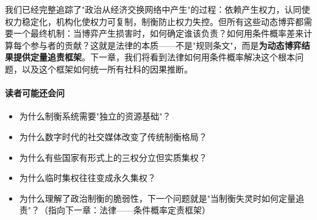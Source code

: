 \documentclass[../main.tex]{subfiles}
\begin{document}
	我们已经完整追踪了"政治从经济交换网络中产生"的过程：依赖产生权力，认同使权力稳定化，机构化使权力可复制，制衡防止权力失控。但所有这些动态博弈都需要一个最终机制：当博弈产生损害时，如何确定谁该负责？如何用条件概率差来计算每个参与者的贡献？这就是法律的本质——不是"规则条文"，而是\textbf{为动态博弈结果提供定量追责框架}。下一章，我们将看到法律如何用条件概率解决这个根本问题，以及这个框架如何统一所有社科的因果推断。
	
	\paragraph*{读者可能还会问}
	\begin{itemize}

	\item 为什么制衡系统需要"独立的资源基础"？

	\item 为什么数字时代的社交媒体改变了传统制衡格局？

	\item 为什么有些国家有形式上的三权分立但实质集权？

	\item 为什么临时集权往往变成永久集权？

	\item 为什么理解了政治制衡的脆弱性，下一个问题就是"当制衡失灵时如何定量追责"？（指向下一章：法律——条件概率定责框架）
	\end{itemize}
	
\end{document}
